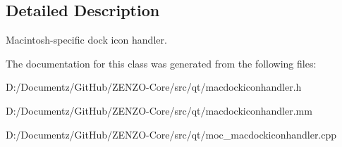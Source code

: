 \subsection{Detailed Description}
Macintosh-\/specific dock icon handler. 

The documentation for this class was generated from the following files\+:\begin{DoxyCompactItemize}
\item 
D\+:/\+Documentz/\+Git\+Hub/\+Z\+E\+N\+Z\+O-\/\+Core/src/qt/macdockiconhandler.\+h\item 
D\+:/\+Documentz/\+Git\+Hub/\+Z\+E\+N\+Z\+O-\/\+Core/src/qt/macdockiconhandler.\+mm\item 
D\+:/\+Documentz/\+Git\+Hub/\+Z\+E\+N\+Z\+O-\/\+Core/src/qt/moc\+\_\+macdockiconhandler.\+cpp\end{DoxyCompactItemize}
